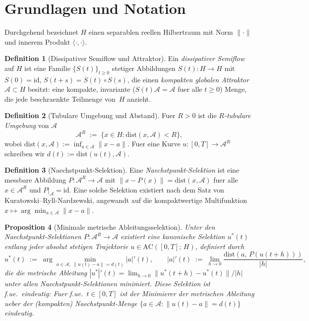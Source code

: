 \documentclass[12pt,a4paper]{article}
\theoremstyle{definition}
\newtheorem{definition}{Definition}[section]
\theoremstyle{plain}
\newtheorem{proposition}[definition]{Proposition}
\theoremstyle{remark}
\newcommand{\dist}{\mathrm{dist}}
\newcommand{\AC}{\mathrm{AC}}
\newcommand{\id}{\mathrm{id}}
\begin{document}
\section{Grundlagen und Notation}

Durchgehend bezeichnet $H$ einen separablen reellen Hilbertraum mit
Norm $\|\cdot\|$ und innerem Produkt $\langle\cdot,\cdot\rangle$.

\begin{definition}[Dissipativer Semiflow und Attraktor]
\label{def:semiflow}
Ein \emph{dissipativer Semiflow} auf $H$ ist eine Familie
$\{S(t)\}_{t \ge 0}$ stetiger Abbildungen $S(t): H \to H$ mit
$S(0) = \id$, $S(t+s) = S(t) \circ S(s)$, die einen
\emph{kompakten globalen Attraktor}
$\mathcal{A} \subset H$ besitzt: eine kompakte, invariante
($S(t)\mathcal{A} = \mathcal{A}$ fuer alle $t \ge 0$) Menge, die
jede beschraenkte Teilmenge von~$H$ anzieht.
\end{definition}

\begin{definition}[Tubulare Umgebung und Abstand]
\label{def:tube}
Fuer $R > 0$ ist die \emph{$R$-tubulare Umgebung} von $\mathcal{A}$
\[
  \mathcal{A}^R
  \;:=\;
  \{x \in H : \dist(x, \mathcal{A}) < R\},
\]
wobei $\dist(x, \mathcal{A}) := \inf_{a \in \mathcal{A}} \|x - a\|$.
Fuer eine Kurve $u: [0,T] \to \mathcal{A}^R$ schreiben wir
$d(t) := \dist(u(t), \mathcal{A})$.
\end{definition}

\begin{definition}[Naechstpunkt-Selektion]
\label{def:selection}
Eine \emph{Naechstpunkt-Selektion} ist eine messbare Abbildung
$P: \mathcal{A}^R \to \mathcal{A}$ mit
$\|x - P(x)\| = \dist(x, \mathcal{A})$ fuer alle
$x \in \mathcal{A}^R$ und $P|_{\mathcal{A}} = \id$.
Eine solche Selektion existiert nach dem Satz von
Kuratowski--Ryll-Nardzewski, angewandt auf die kompaktwertige
Multifunktion
$x \mapsto \arg\min_{a \in \mathcal{A}} \|x-a\|$.
\end{definition}

\begin{proposition}[Minimale metrische Ableitungsselektion]
\label{prop:minimal-selection}
Unter den Naechstpunkt-Selektionen
$P: \mathcal{A}^R \to \mathcal{A}$ existiert eine
\emph{kanonische Selektion} $u^*(t)$ entlang jeder absolut stetigen
Trajektorie $u \in \AC([0,T];\,H)$, definiert durch
\[
  u^*(t)
  \;:=\;
  \arg\min_{a \in \mathcal{A},\;\|u(t)-a\|=d(t)}
  |a|'(t),
  \qquad
  |a|'(t)
  \;:=\;
  \lim_{h \to 0}
  \frac{\dist(a,\,P(u(t+h)))}{|h|},
\]
die die metrische Ableitung
$|u^*|'(t) = \lim_{h\to 0} \|u^*(t+h) - u^*(t)\|/|h|$
unter allen Naechstpunkt-Selektionen minimiert. Diese Selektion ist
f.ue.\ eindeutig: Fuer f.ue.\ $t \in [0,T]$ ist der Minimierer der
metrischen Ableitung ueber der (kompakten) Naechstpunkt-Menge
$\{a \in \mathcal{A} : \|u(t)-a\| = d(t)\}$ eindeutig.
\end{proposition}
\end{document}
